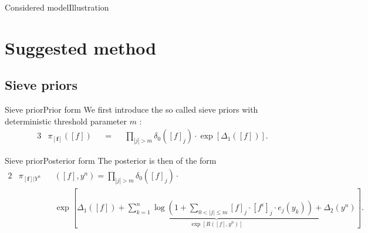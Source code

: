 \documentclass[10pt]{beamer}
\begin{document}
\begin{frame}{Considered model}{Illustration}
\begin{center}
\end{center}
\end{frame}

\section{Suggested method}
\subsection{Sieve priors}

\begin{frame}{Sieve prior}{Prior form}
We first introduce the so called sieve priors with deterministic threshold parameter $m$ :
\begin{alignat*}{3}
&\pi_{\left[\boldsymbol{f}\right]}\left(\left[f\right]\right) &&=&& \prod\limits_{\left\vert j \right\vert > m} \delta_{0}\left(\left[f\right]_{j}\right)\cdot\exp\left[\Delta_{1}\left(\left[f\right]\right)\right].
\end{alignat*}

\end{frame}

\begin{frame}{Sieve prior}{Posterior form}
The posterior is then of the form
\begin{alignat*}{2}
&\pi_{\left[\boldsymbol{f}\right] \vert Y^{n}}&&\left(\left[f\right], y^{n}\right) = \prod\limits_{\left\vert j \right\vert > m} \delta_{0}\left(\left[f\right]_{j}\right) \cdot\\
& && \exp\left[\underbrace{\Delta_{1}\left(\left[f\right]\right) + \sum\limits_{k = 1}^{n} \log\left(1 + \sum\limits_{0 < \vert j \vert \leq m} \left[f\right]_{j} \cdot \left[f^{\epsilon}\right]_{j} \cdot e_{j}(y_{k})\right) + \Delta_{2}(y^{n})}_{\exp\left[R\left(\left[f\right], y^{n}\right)\right]}\right].
\end{alignat*}
\end{frame}
\end{document}
